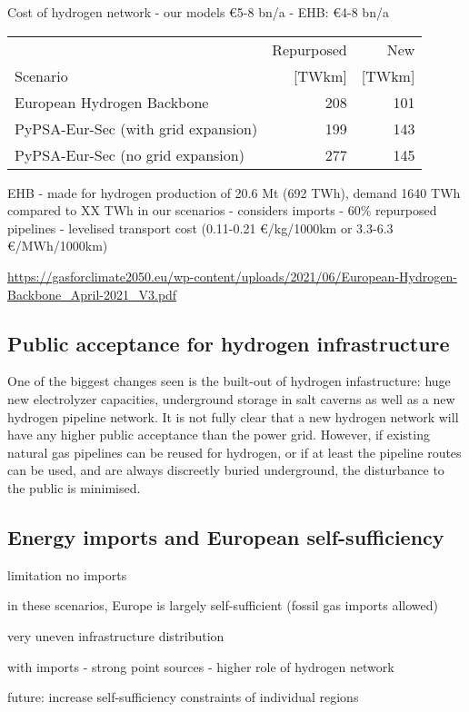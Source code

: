 Cost of hydrogen network
- our models \euro 5-8 bn/a
- EHB: \euro 4-8 bn/a

\begin{tabular}{lrr}
    \toprule
     & Repurposed & New \\
     Scenario& [TWkm] & [TWkm] \\
    \midrule
    European Hydrogen Backbone & 208 & 101 \\
    PyPSA-Eur-Sec (with grid expansion) & 199 & 143 \\
    PyPSA-Eur-Sec (no grid expansion) & 277 & 145 \\
    \bottomrule
  \end{tabular}

EHB
- made for hydrogen production of 20.6 Mt (692 TWh), demand 1640 TWh compared to XX TWh in our scenarios
- considers imports
- 60\% repurposed pipelines
- levelised transport cost (0.11-0.21 \euro/kg/1000km or 3.3-6.3 \euro/MWh/1000km)


\url{https://gasforclimate2050.eu/wp-content/uploads/2021/06/European-Hydrogen-Backbone_April-2021_V3.pdf}

\subsection*{Public acceptance for hydrogen infrastructure}

One of the biggest changes seen is the built-out of hydrogen infastructure: huge new
electrolyzer capacities, underground storage in salt caverns as well
as a new hydrogen pipeline network. It is not fully clear that a new
hydrogen network will have any higher public acceptance than the power
grid. However, if existing natural gas pipelines can be reused for hydrogen,
or if at least the pipeline routes can be used, and are always discreetly buried underground, the disturbance to
the public is minimised.

\subsection*{Energy imports and European self-sufficiency}

limitation no imports

in these scenarios, Europe is largely self-sufficient (fossil gas imports allowed)

very uneven infrastructure distribution

with imports
- strong point sources
- higher role of hydrogen network

future: increase self-sufficiency constraints of individual regions

